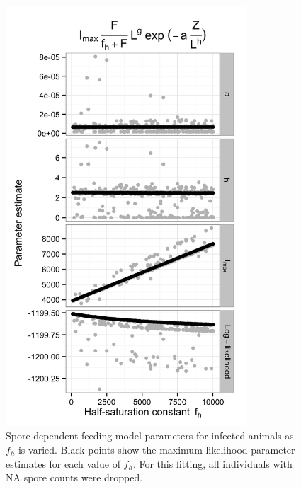 \documentclass[12pt,reqno,final,pdftex]{amsart}\usepackage[]{graphicx}\usepackage[]{color}
\newenvironment{knitrout}{}{} %
\theoremstyle{plain}
\numberwithin{equation}{part}
\begin{document}
\begin{knitrout}\scriptsize
{}\color{fgcolor}\begin{figure}

\includegraphics[width=0.8\textwidth]{figure/spore-dep-feeding-1} \hfill{}

\caption[Spore-dependent feeding model parameters for infected animals as ]{Spore-dependent feeding model parameters for infected animals as $f_h$ is varied. Black points show the maximum likelihood parameter estimates for each value of $f_h$. For this fitting, all individuals with NA spore counts were dropped.}\label{fig:spore-dep-feeding}
\end{figure}


\end{knitrout}
\end{document}
